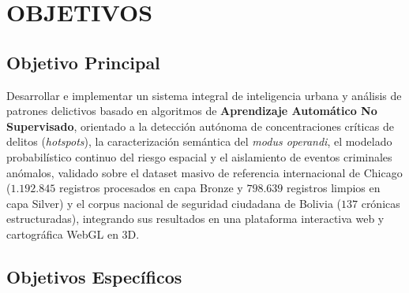 \section{OBJETIVOS}

\subsection{Objetivo Principal}

Desarrollar e implementar un sistema integral de inteligencia urbana y análisis de patrones delictivos basado en algoritmos de \textbf{Aprendizaje Automático No Supervisado}, orientado a la detección autónoma de concentraciones críticas de delitos (\textit{hotspots}), la caracterización semántica del \textit{modus operandi}, el modelado probabilístico continuo del riesgo espacial y el aislamiento de eventos criminales anómalos, validado sobre el dataset masivo de referencia internacional de Chicago ($1.192.845$ registros procesados en capa Bronze y $798.639$ registros limpios en capa Silver) y el corpus nacional de seguridad ciudadana de Bolivia ($137$ crónicas estructuradas), integrando sus resultados en una plataforma interactiva web y cartográfica WebGL en 3D.

\subsection{Objetivos Específicos}

